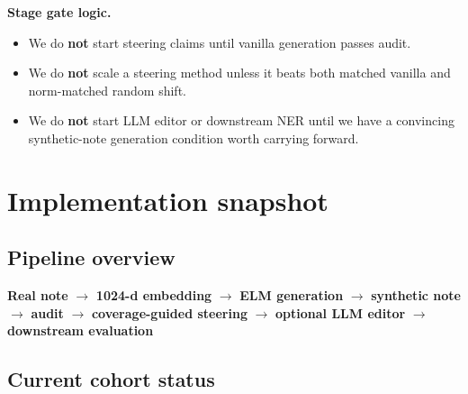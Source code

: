 \documentclass[11pt]{article}
\begin{document}
\noindent\textbf{Stage gate logic.}
\begin{itemize}[nosep]
  \item We do \textbf{not} start steering claims until vanilla generation passes audit.
  \item We do \textbf{not} scale a steering method unless it beats both matched vanilla and norm-matched random shift.
  \item We do \textbf{not} start LLM editor or downstream NER until we have a convincing synthetic-note generation condition worth carrying forward.
\end{itemize}

\section{Implementation snapshot}
\subsection{Pipeline overview}

\begin{center}
\small
\textbf{Real note}
$\rightarrow$ \textbf{1024-d embedding}
$\rightarrow$ \textbf{ELM generation}
$\rightarrow$ \textbf{synthetic note}
$\rightarrow$ \textbf{audit}
$\rightarrow$ \textbf{coverage-guided steering}
$\rightarrow$ \textbf{optional LLM editor}
$\rightarrow$ \textbf{downstream evaluation}
\end{center}

\subsection{Current cohort status}
\end{document}

